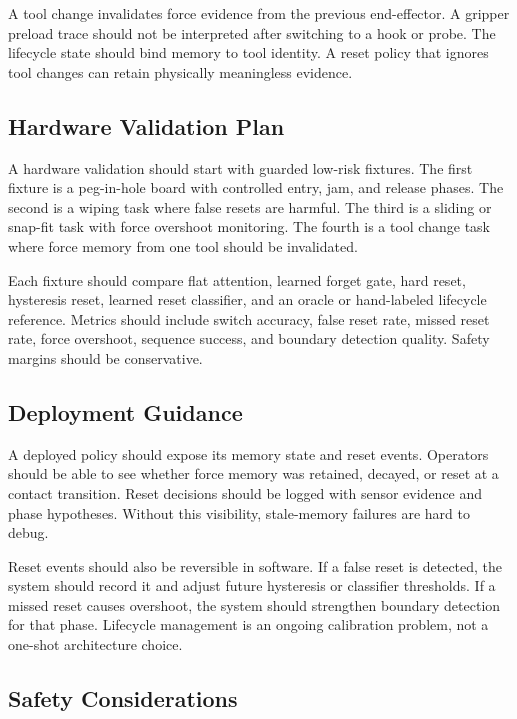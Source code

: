 \documentclass{article}
\begin{document}
A tool change invalidates force evidence from the previous end-effector. A
gripper preload trace should not be interpreted after switching to a hook or
probe. The lifecycle state should bind memory to tool identity. A reset policy
that ignores tool changes can retain physically meaningless evidence.

\subsection{Hardware Validation Plan}

A hardware validation should start with guarded low-risk fixtures. The first
fixture is a peg-in-hole board with controlled entry, jam, and release phases.
The second is a wiping task where false resets are harmful. The third is a
sliding or snap-fit task with force overshoot monitoring. The fourth is a tool
change task where force memory from one tool should be invalidated.

Each fixture should compare flat attention, learned forget gate, hard reset,
hysteresis reset, learned reset classifier, and an oracle or hand-labeled
lifecycle reference. Metrics should include switch accuracy, false reset rate,
missed reset rate, force overshoot, sequence success, and boundary detection
quality. Safety margins should be conservative.

\subsection{Deployment Guidance}

A deployed policy should expose its memory state and reset events. Operators
should be able to see whether force memory was retained, decayed, or reset at
a contact transition. Reset decisions should be logged with sensor evidence and
phase hypotheses. Without this visibility, stale-memory failures are hard to
debug.

Reset events should also be reversible in software. If a false reset is
detected, the system should record it and adjust future hysteresis or
classifier thresholds. If a missed reset causes overshoot, the system should
strengthen boundary detection for that phase. Lifecycle management is an
ongoing calibration problem, not a one-shot architecture choice.

\subsection{Safety Considerations}
\end{document}
